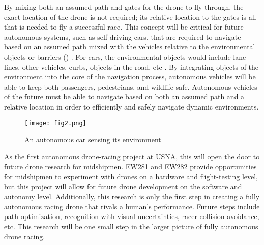 \documentclass[onecolumn,10pt]{IEEEtran}
\begin{document}
By mixing both an assumed path and gates for the drone to fly through, the exact location of the drone is not required; its relative location to the gates is all that is needed to fly a successful race. This concept will be critical for future autonomous systems, such as self-driving cars, that are required to navigate based on an assumed path mixed with the vehicles relative to the environmental objects or barriers () \cite{iot2018how}. For cars, the environmental objects would include lane lines, other vehicles, curbs, objects in the road, etc \cite{rayej2014how}. By integrating objects of the environment into the core of the navigation process, autonomous vehicles will be able to keep both passengers, pedestrians, and wildlife safe. Autonomous vehicles of the future must be able to navigate based on both an assumed path and a relative location in order to efficiently and safely navigate dynamic environments.  
\begin{figure}[hb]
\begin{center}
\texttt{[image: fig2.png]}
\end{center}
\caption{An autonomous car sensing its environment}
\label{fig:2}
\end{figure}

As the first autonomous drone-racing project at USNA, this will open the door to future drone research for midshipmen. EW281 and EW282 provide opportunities for midshipmen to experiment with drones on a hardware and flight-testing level, but this project will allow for future drone development on the software and autonomy level. Additionally, this research is only the first step in creating a fully autonomous racing drone that rivals a human’s performance. Future steps include path optimization, recognition with visual uncertainties, racer collision avoidance, etc. This research will be one small step in the larger picture of fully autonomous drone racing.
\end{document}
